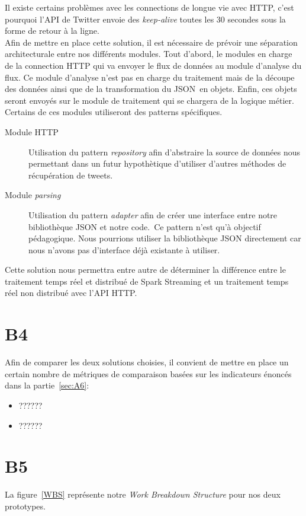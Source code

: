   Il existe certains problèmes avec les connections de longue vie avec HTTP, c'est pourquoi l'API de Twitter envoie des \textit{keep-alive} toutes les 30 secondes sous la forme de retour à la ligne.\\

  Afin de mettre en place cette solution, il est nécessaire de prévoir une séparation architecturale entre nos différents modules. Tout d'abord, le modules en charge de la connection HTTP qui va envoyer le flux de données au module d'analyse du flux. Ce module d'analyse n'est pas en charge du traitement mais de la découpe des données ainsi que de la transformation du JSON en objets. Enfin, ces objets seront envoyés sur le module de traitement qui se chargera de la logique métier.\\

  Certains de ces modules utiliseront des patterns spécifiques.
  \begin{description}
    \item[Module HTTP] Utilisation du pattern \textit{repository} afin d'abstraire la source de données nous permettant dans un futur hypothètique d'utiliser d'autres méthodes de récupération de tweets.
    \item[Module \textit{parsing}] Utilisation du pattern \textit{adapter} afin de créer une interface entre notre bibliothèque JSON et notre code. Ce pattern n'est qu'à objectif pédagogique. Nous pourrions utiliser la bibliothèque JSON directement car nous n'avons pas d'interface déjà existante à utiliser.
  \end{description}

  Cette solution nous permettra entre autre de déterminer la différence entre le traitement temps réel et distribué de Spark Streaming et un traitement temps réel non distribué avec l'API HTTP.


\section{B4}
\label{sec:B4}
  Afin de comparer les deux solutions choisies, il convient de mettre en place un certain nombre de métriques de comparaison basées sur les indicateurs énoncés dans la partie~\ref{sec:A6}:

  \begin{itemize}
    \item ??????
    \item ??????
  \end{itemize}


\section{B5}
\label{sec:B5}
  La figure~\ref{WBS} représente notre \emph{Work Breakdown Structure} pour nos deux prototypes.


